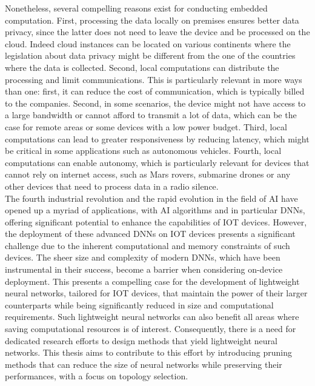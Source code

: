 
Nonetheless, several compelling reasons exist for conducting embedded
computation. First, processing the data locally on premises ensures better data
privacy, since the latter does not need to leave the device and be processed on
the cloud. Indeed cloud instances can be located on various continents where the
legislation about data privacy might be different from the one of the countries
where the data is collected. Second, local computations can distribute the
processing and limit communications. This is particularly relevant in more ways
than one: first, it can reduce the cost of communication, which is typically
billed to the companies. Second, in some scenarios, the device might not have
access to a large bandwidth or cannot afford to transmit a lot of data, which
can be the case for remote areas or some devices with a low power budget. Third,
local computations can lead to greater responsiveness by reducing latency, which
might be critical in some applications such as autonomous vehicles. Fourth,
local computations can enable autonomy, which is particularly relevant for
devices that cannot rely on internet access, such as Mars rovers, submarine
drones or any other devices that need to process data in a radio silence.\\

The fourth industrial revolution and the rapid evolution in the field of \ac{AI}
have opened up a myriad of applications, with \ac{AI} algorithms and in
particular \acp{DNN}, offering significant potential to enhance the capabilities
of \ac{IOT} devices. However, the deployment of these advanced \acp{DNN} on
\ac{IOT} devices presents a significant challenge due to the inherent
computational and memory constraints of such devices. The sheer size and
complexity of modern \acp{DNN}, which have been instrumental in their success,
become a barrier when considering on-device deployment. This presents a
compelling case for the development of lightweight neural networks, tailored for
\ac{IOT} devices, that maintain the power of their larger counterparts while
being significantly reduced in size and computational requirements. Such
lightweight neural networks can also benefit all areas where saving
computational resources is of interest. Consequently, there is a need for
dedicated research efforts to design methods that yield lightweight neural
networks. This thesis aims to contribute to this effort by introducing pruning
methods that can reduce the size of neural networks while preserving their
performances, with a focus on topology selection.\\

